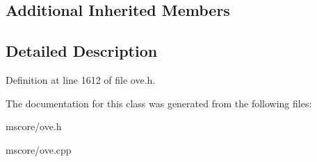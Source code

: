 \subsection*{Additional Inherited Members}


\subsection{Detailed Description}


Definition at line 1612 of file ove.\+h.



The documentation for this class was generated from the following files\+:\begin{DoxyCompactItemize}
\item 
mscore/ove.\+h\item 
mscore/ove.\+cpp\end{DoxyCompactItemize}
